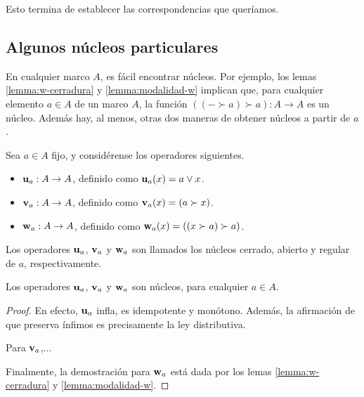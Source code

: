 Esto termina de establecer las correspondencias que queríamos.

\subsection{Algunos núcleos particulares}

En cualquier marco $A$, es fácil encontrar núcleos.
Por ejemplo, los lemas \ref{lemma:w-cerradura}
y \ref{lemma:modalidad-w} implican que, para cualquier elemento
$a\in A$ de un marco $A$, la función $((-\succ a)\succ a):A\to A$
es un núcleo.
Además hay, al menos, otras dos maneras de obtener núcleos
a partir de $a$.

\begin{definition}
Sea $a\in A$ fijo, y considérense los operadores siguientes.
  \begin{itemize}
    \item $\mathbf u_{a}:A\to A$, definido como $\mathbf u_{a}(x)= a\vee x$.
    \item $\mathbf v_{a}:A\to A$, definido como $\mathbf v_{a}(x)=(a\succ
    x)$.
    \item $\mathbf w_{a}:A\to A$, definido como
      $\mathbf w_{a}(x)=((x\succ a)\succ a)$.
  \end{itemize}
  Los operadores $\mathbf u_{a}$, $\mathbf v_{a}$ y $\mathbf w_{a}$ son llamados
  los núcleos cerrado, abierto y regular de $a$, respectivamente.
\end{definition}
\begin{proposition}
  Los operadores $\mathbf u_{a}$, $\mathbf v_{a}$ y $\mathbf w_{a}$ son núcleos, para
  cualquier $a\in A$.
\end{proposition}
\begin{proof}
  En efecto, $\mathbf u_{a}$ infla, es idempotente
  y monótono. Además, la afirmación de que preserva ínfimos es
  precisamente la ley distributiva.

  Para $\mathbf v_{a}$,...

  Finalmente, la demostración para $\mathbf w_{a}$ está
  dada por los lemas \ref{lemma:w-cerradura} y
  \ref{lemma:modalidad-w}.
\end{proof}

